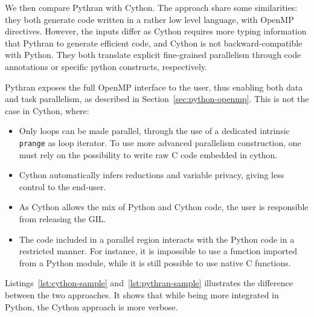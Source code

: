 \documentclass{llncs}
\begin{document}
We then compare Pythran with Cython. The approach share some similarities: they
both generate code written in a rather low level language, with OpenMP
directives. However, the inputs differ as Cython requires more typing
information that Pythran to generate efficient code, and Cython is not
backward-compatible with Python. They both translate explicit fine-grained
parallelism through code annotations or specific python constructs,
respectively.

Pythran exposes the full OpenMP interface to the user, thus enabling both data
and task parallelism, as described in Section~\ref{sec:python-openmp}. This is
not the case in Cython, where:

\begin{itemize}
    \item Only loops can be made parallel, through the use of a dedicated
        intrinsic \texttt{prange} as loop iterator. To use more advanced
        parallelism construction, one must rely on the possibility to write raw C
        code embedded in cython.~

    \item Cython automatically infers reductions and variable privacy, giving
        less control to the end-user.

    \item As Cython allows the mix of Python and Cython code, the user is
        responsible from releasing the GIL.

    \item The code included in a parallel region interacts with the Python code
        in a restricted manner. For instance, it is impossible to use a function
        imported from a Python module, while it is still possible to use native
        C functions.
\end{itemize}

Listings~\ref{lst:cython-sample} and~\ref{lst:pythran-sample} illustrates the
difference between the two approaches. It shows that while being more integrated
in Python, the Cython approach is more verbose.
\end{document}

